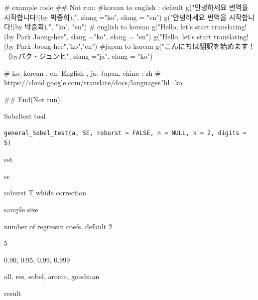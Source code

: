 \documentclass[a4paper]{book}
\begin{document}
\begin{Examples}
\begin{ExampleCode}
# example code
\#\# Not run: 
#korean to english : default
g("안녕하세요 번역을 시작합니다!(by 박중희).", slang ="ko", elang = "en")
g("안녕하세요 번역을 시작합니다!(by 박중희).", "ko", "en")
# english to korean
g("Hello, let’s start translating! (by Park Joong-hee", slang ="ko", elang = "en")
g("Hello, let’s start translating! (by Park Joong-hee","ko","en")
#japan to korean
g("こんにちは翻訳を始めます！（byパク・ジュンヒ", slang ="ja", elang = "ko")

# ko: korean , en: English , ja: Japan, china : zh
# https://cloud.google.com/translate/docs/languages?hl=ko

## End(Not run)
\end{ExampleCode}
\end{Examples}
%
\begin{Description}
Sobeltest toal
\end{Description}
%
\begin{Usage}
\begin{verbatim}
general_Sobel_test(a, SE, roburst = FALSE, n = NULL, k = 2, digits = 5)
\end{verbatim}
\end{Usage}
%
\begin{Arguments}
\begin{ldescription}
\item[\code{a}] est

\item[\code{SE}] se

\item[\code{roburst}] roburst T whide correction

\item[\code{n}] sample size

\item[\code{k}] number of regressin coefs, default 2

\item[\code{digits}] 5

\item[\code{conf}] 0.90, 0.95, 0.99, 0.999

\item[\code{type}] all, res, sobel, aroian, goodman
\end{ldescription}
\end{Arguments}
%
\begin{Value}
result
\end{Value}
\end{document}
